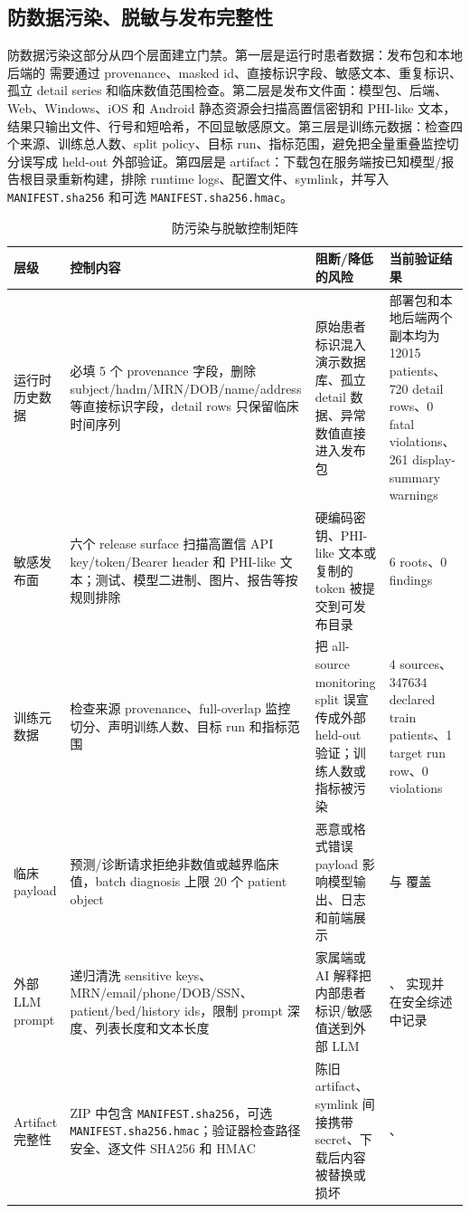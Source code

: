 \documentclass[11pt,a4paper]{article}
\begin{document}
\subsection{防数据污染、脱敏与发布完整性}
防数据污染这部分从四个层面建立门禁。第一层是运行时患者数据：发布包和本地后端的  需要通过 provenance、masked id、直接标识字段、敏感文本、重复标识、孤立 detail series 和临床数值范围检查。第二层是发布文件面：模型包、后端、Web、Windows、iOS 和 Android 静态资源会扫描高置信密钥和 PHI-like 文本，结果只输出文件、行号和短哈希，不回显敏感原文。第三层是训练元数据：检查四个来源、训练总人数、split policy、目标 run、指标范围，避免把全量重叠监控切分误写成 held-out 外部验证。第四层是 artifact：下载包在服务端按已知模型/报告根目录重新构建，排除 runtime logs、配置文件、symlink，并写入 \texttt{MANIFEST.sha256} 和可选 \texttt{MANIFEST.sha256.hmac}。

\begin{table}[H]
\centering
\caption{防污染与脱敏控制矩阵}
\label{tab:data-pollution-controls}
\scriptsize
\setlength{\tabcolsep}{3pt}
\renewcommand{\arraystretch}{1.14}
\begin{tabularx}{\textwidth}{@{}l Y Y Y@{}}
\toprule
层级 & 控制内容 & 阻断/降低的风险 & 当前验证结果\\
\midrule
运行时历史数据 & 必填 5 个 provenance 字段，删除 subject/hadm/MRN/DOB/name/address 等直接标识字段，detail rows 只保留临床时间序列 & 原始患者标识混入演示数据库、孤立 detail 数据、异常数值直接进入发布包 & 部署包和本地后端两个副本均为 12015 patients、720 detail rows、0 fatal violations、261 display-summary warnings\\
敏感发布面 & 六个 release surface 扫描高置信 API key/token/Bearer header 和 PHI-like 文本；测试、模型二进制、图片、报告等按规则排除 & 硬编码密钥、PHI-like 文本或复制的 token 被提交到可发布目录 & 6 roots、0 findings\\
训练元数据 & 检查来源 provenance、full-overlap 监控切分、声明训练人数、目标 run 和指标范围 & 把 all-source monitoring split 误宣传成外部 held-out 验证；训练人数或指标被污染 & 4 sources、347634 declared train patients、1 target run row、0 violations\\
临床 payload & 预测/诊断请求拒绝非数值或越界临床值，batch diagnosis 上限 20 个 patient object & 恶意或格式错误 payload 影响模型输出、日志和前端展示 &  与  覆盖\\
外部 LLM prompt & 递归清洗 sensitive keys、MRN/email/phone/DOB/SSN、patient/bed/history ids，限制 prompt 深度、列表长度和文本长度 & 家属端或 AI 解释把内部患者标识/敏感值送到外部 LLM & 、 实现并在安全综述中记录\\
Artifact 完整性 & ZIP 中包含 \texttt{MANIFEST.sha256}，可选 \texttt{MANIFEST.sha256.hmac}；验证器检查路径安全、逐文件 SHA256 和 HMAC & 陈旧 artifact、symlink 间接携带 secret、下载后内容被替换或损坏 & 、\\
\bottomrule
\end{tabularx}
\end{table}
\end{document}
